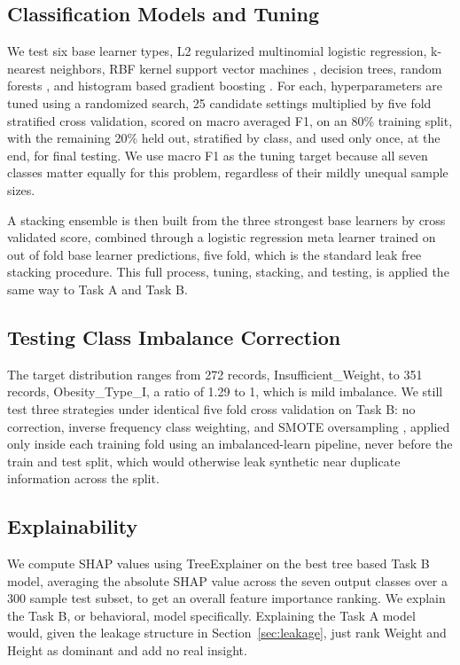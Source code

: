 \documentclass[journal]{IEEEtran}
\begin{document}
\subsection{Classification Models and Tuning}
\label{sec:clf-methods}
We test six base learner types, L2 regularized multinomial logistic regression, k-nearest neighbors, RBF kernel support vector machines \cite{cortes1995svm}, decision trees, random forests \cite{breiman2001randomforests}, and histogram based gradient boosting \cite{friedman2001gradientboosting}. For each, hyperparameters are tuned using a randomized search, 25 candidate settings multiplied  by five fold stratified cross validation, scored on macro averaged F1, on an 80\% training split, with the remaining 20\% held out, stratified by class, and used only once, at the end, for final testing. We use macro F1 as the tuning target because all seven classes matter equally for this problem, regardless of their mildly unequal sample sizes.

A stacking ensemble \cite{wolpert1992stacked} is then built from the three strongest base learners by cross validated score, combined through a logistic regression meta learner trained on out of fold base learner predictions, five fold, which is the standard leak free stacking procedure. This full process, tuning, stacking, and testing, is applied the same way to Task A and Task B.

\subsection{Testing Class Imbalance Correction}
The target distribution ranges from 272 records, Insufficient\_Weight, to 351 records, Obesity\_Type\_I, a ratio of 1.29 to 1, which is mild imbalance. We still test three strategies under identical five fold cross validation on Task B: no correction, inverse frequency class weighting, and SMOTE oversampling \cite{chawla2002smote}, applied only inside each training fold using an imbalanced-learn pipeline, never before the train and test split, which would otherwise leak synthetic near duplicate information across the split.

\subsection{Explainability}
We compute SHAP values \cite{lundberg2017shap} using TreeExplainer on the best tree based Task B model, averaging the absolute SHAP value across the seven output classes over a 300 sample test subset, to get an overall feature importance ranking. We explain the Task B, or behavioral, model specifically. Explaining the Task A model would, given the leakage structure in Section~\ref{sec:leakage}, just rank Weight and Height as dominant and add no real insight.
\end{document}
